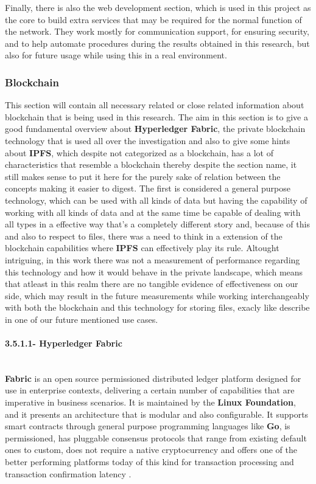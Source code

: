 Finally, there is also the web development section, which is used in this project as the core to build extra services that may be required
for the normal function of the network. They work mostly for communication support, for ensuring security, and to help automate procedures 
during the results obtained in this research, but also for future usage while using this in a real environment.


\subsubsection{Blockchain}
This section will contain all necessary related or close related information about blockchain that is being used in this research. The 
aim in this section is to give a good fundamental overview about \textbf{Hyperledger Fabric}, the private blockchain technology that 
is used all over the investigation and also to give some hints about \textbf{IPFS}, which despite not categorized as a blockchain, has a 
lot of characteristics that resemble a blockchain thereby despite the section name, it still makes sense to put it here for the purely 
sake of relation between the concepts making it easier to digest. The first is considered a general purpose technology, 
which can be used with all kinds of data but having the capability of working with all kinds of data and at the same time be capable 
of dealing with all types in a effective way that's a completely different story and, because of this and also to respect to files, there 
was a need to think in a extension of the blockchain capabilities where \textbf{IPFS} can effectively play its rule. Altought intriguing, 
in this work there was not a measurement of performance regarding this technology and how it would behave in the private landscape, which 
means that atleast in this realm there are no tangible evidence of effectiveness on our side, which may result in the future measurements 
while working interchangeably with both the blockchain and this technology for storing files, exacly like describe in one of our future 
mentioned use cases.

\paragraph{3.5.1.1- Hyperledger Fabric}\mbox{}\\
\textbf{Fabric} is an open source permissioned distributed ledger platform designed for use in enterprise contexts, delivering a 
certain number of capabilities that are imperative in business scenarios. It is maintained by the \textbf{Linux Foundation}, and it presents
an architecture that is modular and also configurable. It supports smart contracts through general purpose programming languages 
like \textbf{Go}, is permissioned, has pluggable consensus protocols that range from existing default ones to custom, does not require 
a native cryptocurrency and offers one of the better performing platforms today of this kind for transaction processing and 
transaction confirmation latency \cite{hyperledger}.

